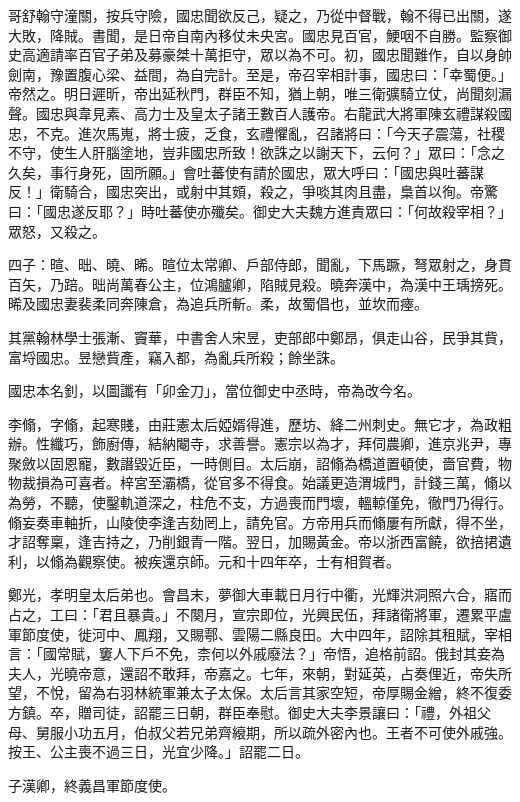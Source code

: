 \begin{pinyinscope}
 哥舒翰守潼關，按兵守險，國忠聞欲反己，疑之，乃從中督戰，翰不得已出關，遂大敗，降賊。書聞，是日帝自南內移仗未央宮。國忠見百官，鯁咽不自勝。監察御史高適請率百官子弟及募豪桀十萬拒守，眾以為不可。初，國忠聞難作，自以身帥劍南，豫置腹心梁、益間，為自完計。至是，帝召宰相計事，國忠曰：「幸蜀便。」帝然之。明日遲昕，帝出延秋門，群臣不知，猶上朝，唯三衛彍騎立仗，尚聞刻漏聲。國忠與韋見素、高力士及皇太子諸王數百人護帝。右龍武大將軍陳玄禮謀殺國忠，不克。進次馬嵬，將士疲，乏食，玄禮懼亂，召諸將曰：「今天子震蕩，社稷不守，使生人肝腦塗地，豈非國忠所致！欲誅之以謝天下，云何？」眾曰：「念之久矣，事行身死，固所願。」會吐蕃使有請於國忠，眾大呼曰：「國忠與吐蕃謀反！」衛騎合，國忠突出，或射中其頞，殺之，爭啖其肉且盡，梟首以徇。帝驚曰：「國忠遂反耶？」時吐蕃使亦殲矣。御史大夫魏方進責眾曰：「何故殺宰相？」眾怒，又殺之。



 四子：暄、昢、曉、晞。暄位太常卿、戶部侍郎，聞亂，下馬蹶，弩眾射之，身貫百矢，乃踣。昢尚萬春公主，位鴻臚卿，陷賊見殺。曉奔漢中，為漢中王瑀搒死。晞及國忠妻裴柔同奔陳倉，為追兵所斬。柔，故蜀倡也，並坎而瘞。



 其黨翰林學士張漸、竇華，中書舍人宋昱，吏部郎中鄭昂，俱走山谷，民爭其貲，富埒國忠。昱戀貲產，竊入都，為亂兵所殺；餘坐誅。



 國忠本名釗，以圖讖有「卯金刀」，當位御史中丞時，帝為改今名。



 李翛，字翛，起寒賤，由莊憲太后婭婿得進，歷坊、絳二州刺史。無它才，為政粗辦。性纖巧，飾廚傳，結納閹寺，求善譽。憲宗以為才，拜伺農卿，進京兆尹，專聚斂以固恩寵，數譖毀近臣，一時側目。太后崩，詔翛為橋道置頓使，嗇官費，物物裁損為可喜者。梓宮至灞橋，從官多不得食。始議更造渭城門，計錢三萬，翛以為勞，不聽，使鑿軌道深之，柱危不支，方過喪而門壞，轀輬僅免，徹門乃得行。翛妄奏車軸折，山陵使李逢吉劾罔上，請免官。方帝用兵而翛屢有所獻，得不坐，才詔奪稟，逢吉持之，乃削銀青一階。翌日，加賜黃金。帝以浙西富饒，欲掊捃遺利，以翛為觀察使。被疾還京師。元和十四年卒，士有相賀者。



 鄭光，孝明皇太后弟也。會昌末，夢御大車載日月行中衢，光輝洪洞照六合，寤而占之，工曰：「君且暴貴。」不闋月，宣宗即位，光興民伍，拜諸衛將軍，遷累平盧軍節度使，徙河中、鳳翔，又賜鄠、雲陽二縣良田。大中四年，詔除其租賦，宰相言：「國常賦，窶人下戶不免，柰何以外戚廢法？」帝悟，追格前詔。俄封其妾為夫人，光曉帝意，還詔不敢拜，帝嘉之。七年，來朝，對延英，占奏俚近，帝失所望，不悅，留為右羽林統軍兼太子太保。太后言其家空短，帝厚賜金繒，終不復委方鎮。卒，贈司徒，詔罷三日朝，群臣奉慰。御史大夫李景讓曰：「禮，外祖父母、舅服小功五月，伯叔父若兄弟齊縗期，所以疏外密內也。王者不可使外戚強。按王、公主喪不過三日，光宜少降。」詔罷二日。



 子漢卿，終義昌軍節度使。



\end{pinyinscope}
